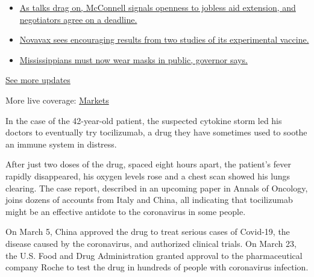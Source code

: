 \begin{itemize}
\tightlist
\item
  \href{https://www.nytimes.com/2020/08/04/world/coronavirus-cases.html?action=click\&pgtype=Article\&state=default\&region=MAIN_CONTENT_1\&context=storylines_live_updates\#link-762df92}{As
  talks drag on, McConnell signals openness to jobless aid extension,
  and negotiators agree on a deadline.}
\item
  \href{https://www.nytimes.com/2020/08/04/world/coronavirus-cases.html?action=click\&pgtype=Article\&state=default\&region=MAIN_CONTENT_1\&context=storylines_live_updates\#link-1228a480}{Novavax
  sees encouraging results from two studies of its experimental
  vaccine.}
\item
  \href{https://www.nytimes.com/2020/08/04/world/coronavirus-cases.html?action=click\&pgtype=Article\&state=default\&region=MAIN_CONTENT_1\&context=storylines_live_updates\#link-794484ed}{Mississippians
  must now wear masks in public, governor says.}
\end{itemize}

\href{https://www.nytimes.com/2020/08/04/world/coronavirus-cases.html?action=click\&pgtype=Article\&state=default\&region=MAIN_CONTENT_1\&context=storylines_live_updates}{See
more updates}

More live coverage:
\href{https://www.nytimes.com/live/2020/08/04/business/stock-market-today-coronavirus?action=click\&pgtype=Article\&state=default\&region=MAIN_CONTENT_1\&context=storylines_live_updates}{Markets}

In the case of the 42-year-old patient, the suspected cytokine storm led
his doctors to eventually try tocilizumab, a drug they have sometimes
used to soothe an immune system in distress.

After just two doses of the drug, spaced eight hours apart, the
patient's fever rapidly disappeared, his oxygen levels rose and a chest
scan showed his lungs clearing. The case report, described in an
upcoming paper in Annals of Oncology, joins dozens of accounts from
Italy and China, all indicating that tocilizumab might be an effective
antidote to the coronavirus in some people.

On March 5, China approved the drug to treat serious cases of Covid-19,
the disease caused by the coronavirus, and authorized clinical trials.
On March 23, the U.S. Food and Drug Administration granted approval to
the pharmaceutical company Roche to test the drug in hundreds of people
with coronavirus infection.

